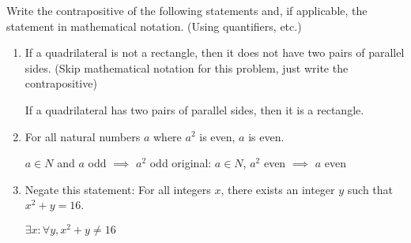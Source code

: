 \question Write the contrapositive of the following statements and, 
if applicable, the statement in mathematical notation. 
(Using quantifiers, etc.)

\begin{enumerate}[label=\alph*]
\item If a quadrilateral is not a rectangle, then it does not have two 
pairs of parallel sides. (Skip mathematical notation for this problem, 
just write the contrapositive)
\begin{solution}[2in]
If a quadrilateral has two pairs of parallel sides, then it is a rectangle.
\end{solution}
\item For all natural numbers $a$ where $a^2$ is even, $a$ is even.
\begin{solution}[2in] 
$a \in N$ and $a$ odd $\implies$  $a^2$ odd 
original: $a \in N$, $a^2$ even $\implies$ $a$ even
\end{solution}
\item Negate this statement: For all integers $x$, there exists an integer $y$ such that $x^2 + y = 16$.
\begin{solution}
$\exists x : \forall y, x^2 + y \neq 16$
\end{solution}
\end{enumerate}

\clearpage

